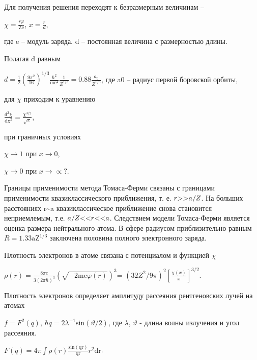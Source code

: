 \documentclass[a4paper,14pt, openany, twoside, draft]{extbook} %
\begin{document}
Для получения решения переходят к безразмерным величинам –

 $\chi =\frac{\mathit{r\varphi }}{{\text{Ze}}}$,  $x=\frac r d$,

где e – модуль заряда. d – постоянная величина с размерностью длины.

Полагая d равным

 $d=\frac 1 2\left(\frac{9\pi ^2}{16}\right)^{1/3}\frac{\hbar ^2}{{\text{me}}^2}\frac 1{Z^{1/3}}=0.88\frac{a_0}{Z^{1/3}}$, где a0 – радиус первой боровской орбиты,

для ${\chi}$  приходим к уравнению

 $\frac{d^2\chi }{{\text{dx}}^2}=\frac{\chi ^{3/2}}{\sqrt x}$,

при граничных условиях

 $\chi \rightarrow 1$ при  $x\rightarrow 0$,

 $\chi \rightarrow 0$ при  $x\rightarrow \propto ?$.

Границы применимости метода Томаса-Ферми связаны с границами применимости квазиклассического приближения, т. е.  $r\text{{\textgreater}{\textgreater}}a/Z$. На больших расстояниях r\~{}a квазиклассическое приближение снова становится неприемлемым, т.е.  $a/Z\text{{\textless}{\textless}}r\text{{\textless}{\textless}}a$. Следствием модели Томаса-Ферми является оценка размера нейтрального атома. В сфере радиусом приблизительно равным  $R=1.33{\text{aZ}}^{1/3}$ заключена половина полного электронного заряда.

Плотность электронов в атоме связана с потенциалом и функцией  $\chi $

 $\rho (r)=\frac{8\mathit{\pi e}}{3(2\pi \hbar )^3}\left(\sqrt{-2{\text{me}}\varphi (r)}\right)^3$= $\left(32Z^2/9\pi \right)^2\left[\frac{\chi (x)} x\right]^{3/2}$.

Плотность электронов определяет амплитуду рассеяния рентгеновских лучей на атомах

 $f=F^2(q)$,  $\hbar q=2\lambda ^{-1}\text{sin}(\vartheta /2)$, где ${\lambda}$,  $\vartheta $ - длина волны излучения и угол рассеяния.

 $F(q)=4\pi \int \rho (r)\frac{\text{sin}({\text{qr}})}{{\text{qr}}}r^2{\text{dr}}$.\ \ \ \
\end{document}
